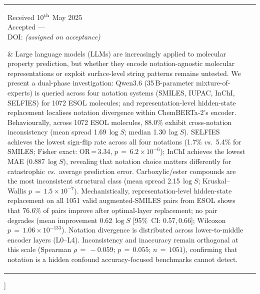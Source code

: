 \documentclass[twoside,twocolumn,9pt]{article}
\newcommand{\logS}{\ensuremath{\log S}}
\begin{document}
\begin{@twocolumnfalse}
\begin{tabular}{m{4.5cm} p{13.5cm} }
\parbox{4.2cm}{\sffamily\scriptsize
  Received 10$^{\rm th}$ May 2025\\
  Accepted \phantom{10}---\phantom{May 2025}\\[3pt]
  DOI: \textit{(assigned on acceptance)}} &
\noindent\normalsize{%
Large language models (LLMs) are increasingly applied to molecular property prediction, but whether they encode notation-agnostic molecular representations or exploit surface-level string patterns remains untested. We present a dual-phase investigation: Qwen3.6 (35\,B-parameter mixture-of-experts) is queried across four notation systems (SMILES, IUPAC, InChI, SELFIES) for 1072 ESOL molecules; and representation-level hidden-state replacement localises notation divergence within ChemBERTa-2's encoder. Behaviourally, across 1072 ESOL molecules, 88.0\% exhibit cross-notation inconsistency (mean spread 1.69\,$\logS$; median 1.30\,$\logS$). SELFIES achieves the lowest sign-flip rate across all four notations (1.7\% \textit{vs.}\ 5.4\% for SMILES; Fisher exact: OR\,=\,3.34, $p\,=\,6.2\!\times\!10^{-6}$); InChI achieves the lowest MAE (0.887\,$\logS$), revealing that notation choice matters differently for catastrophic \textit{vs.}\ average prediction error. Carboxylic/ester compounds are the most inconsistent structural class (mean spread 2.15\,$\logS$; Kruskal--Wallis $p\,=\,1.5\!\times\!10^{-7}$). Mechanistically, representation-level hidden-state replacement on all 1051 valid augmented-SMILES pairs from ESOL shows that 76.6\% of pairs improve after optimal-layer replacement; no pair degrades (mean improvement 0.62\,$\logS$ [95\%~CI: 0.57,\,0.66]; Wilcoxon $p\,=\,1.06\!\times\!10^{-133}$). Notation divergence is distributed across lower-to-middle encoder layers (L0--L4). Inconsistency and inaccuracy remain orthogonal at this scale (Spearman $\rho\,=\,-0.059$; $p\,=\,0.055$; $n\,=\,1051$), confirming that notation is a hidden confound accuracy-focused benchmarks cannot detect.%
} \\

\end{tabular}

 \end{@twocolumnfalse} \vspace{0.6cm}
]

\renewcommand*\rmdefault{bch}\normalfont\upshape
\rmfamily
\section*{}
\vspace{-1cm}
\end{document}
